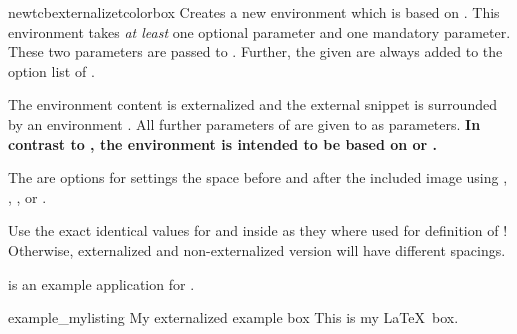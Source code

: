 \begin{docCommand}[doc new=2015-03-11]{newtcbexternalizetcolorbox}{}
  Creates a new environment  which is based on
  . This environment takes \emph{at least}
  one optional parameter and one mandatory parameter.
  These two parameters are passed to .
  Further, the given  are always added to the option list of .\par
  The environment content is externalized and the external snippet is surrounded
  by an environment . All further parameters of 
  are given to  as parameters.
  \textbf{In contrast to , the
  environment  is intended to be based on 
  or .}\par
  The  are options for settings the space before
  and after the included image using , ,
  , or .
  \begin{marker}
  Use the exact identical values for  and 
  inside  as they where used for definition of
  ! Otherwise, externalized and non-externalized version will have
  different spacings.
  \end{marker}
   is an example application for .



{
\begin{dispExample}
\begin{exmyownlisting}{example_mylisting}%
  {My externalized example box}
This is my \LaTeX\ box.
\end{exmyownlisting}
\end{dispExample}
}
\end{docCommand}




